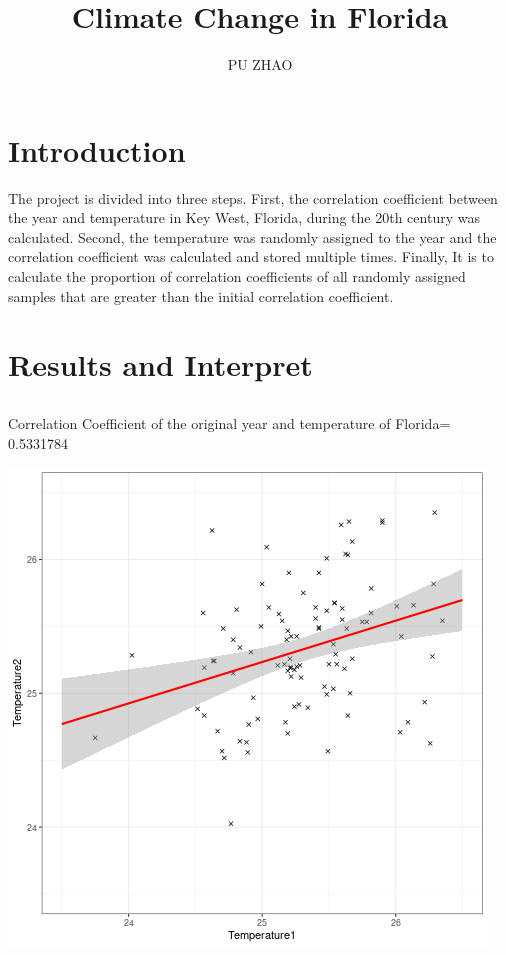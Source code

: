 \documentclass[a4paper, 11pt]{article}
\title{Climate Change in Florida}
\author{PU ZHAO}
\date{}
\begin{document}
\maketitle

\section{Introduction}

The project is divided into three steps. First, the correlation coefficient between the year and temperature in Key West, Florida, during the 20th century was calculated. Second, the temperature was randomly assigned to the year and the correlation coefficient was calculated and stored multiple times. Finally, It is to calculate the proportion of correlation coefficients of all randomly assigned samples that are greater than the initial correlation coefficient.

\section{Results and Interpret}
\subsection{}
Correlation Coefficient of the original year and temperature of Florida= 0.5331784 

\includegraphics[scale=0.35]{../data/ats_plot.png}
\end{document}
